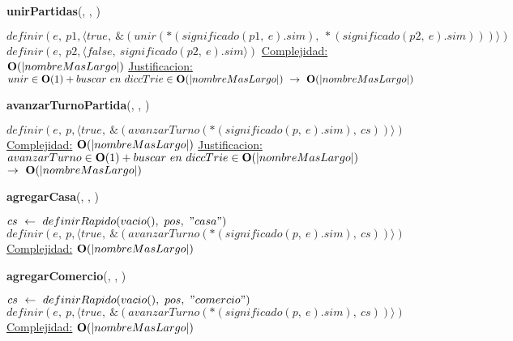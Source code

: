 \begin{Algoritmos}
    \begin{algorithm}[H]{\textbf{unirPartidas}(, , )}
        \begin{algorithmic}[1]
            \State $definir(e,\ p1, \langle true,\ \&(unir(*(significado(p1,\ e).sim),\ *(significado(p2,\ e).sim)))\rangle)$
            \State $definir(e,\ p2, \langle false,\ significado(p2,\ e).sim\rangle)$
            \medskip
            \Statex \underline{Complejidad:} $\bold{O}(|nombreMasLargo|)$
            \Statex \underline{Justificacion:} $unir \in \bold{O}(1) + buscar\ en\ diccTrie \in \bold{O}(|nombreMasLargo|)\ \rightarrow\ \bold{O}(|nombreMasLargo|)$
        \end{algorithmic}
    \end{algorithm}   
    
    \begin{algorithm}[H]{\textbf{avanzarTurnoPartida}(, , )}
        \begin{algorithmic}[1]
            \State $definir(e,\ p, \langle true,\ \& (avanzarTurno(*(significado(p,\ e).sim),\ cs))\rangle)$ 
            \medskip
            \Statex \underline{Complejidad:} $\bold{O}(|nombreMasLargo|)$
            \Statex \underline{Justificacion:} $avanzarTurno \in \bold{O}(1) + buscar\ en\ diccTrie \in \bold{O}(|nombreMasLargo|)$
            \Statex \tab\tab\tab $\rightarrow\ \bold{O}(|nombreMasLargo|)$
        \end{algorithmic}
    \end{algorithm}   

    \begin{algorithm}[H]{\textbf{agregarCasa}(, , )} %
    \begin{algorithmic}[1]
        \State $cs\ \gets\ definirRapido(vacio(),\ pos,\ "casa")$
        \State $definir(e,\ p, \langle true,\ \& (avanzarTurno(*(significado(p,\ e).sim),\ cs))\rangle)$
        \medskip
        \Statex \underline{Complejidad:} $\bold{O}(|nombreMasLargo|)$
    \end{algorithmic}
    \end{algorithm}
    
    \begin{algorithm}[H]{\textbf{agregarComercio}(, , )} %
    \begin{algorithmic}[1]
        \State $cs\ \gets\ definirRapido(vacio(),\ pos,\ "comercio")$
        \State $definir(e,\ p, \langle true,\ \& (avanzarTurno(*(significado(p,\ e).sim),\ cs))\rangle)$
        \medskip
        \Statex \underline{Complejidad:} $\bold{O}(|nombreMasLargo|)$
    \end{algorithmic}
    \end{algorithm}


\end{Algoritmos}
